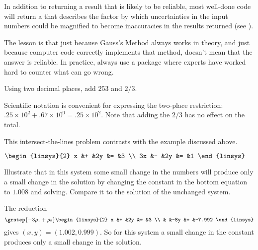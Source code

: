 In addition to returning a result that is likely to be reliable,
most well-done code will return a 
%
that describes the factor by which uncertainties in the input numbers
could be magnified to become inaccuracies in the results returned 
(see \cite{Rice}).

The lesson is that
just because Gauss's Method always works in theory, and just
because computer code correctly implements that method,
doesn't mean that the answer is reliable.
In practice, always use a package
where experts have worked hard to counter what can go wrong.

\begin{exercises}
  \item 
    Using two decimal places, add $253$ and $2/3$.
    \begin{answer}
      Scientific notation is convenient for expressing 
      the two-place restriction:
      $.25\times 10^{2}+.67\times 10^{0}=.25\times 10^{2}$.
      Note that adding the $2/3$ has no effect on the total.
    \end{answer}
  \item 
    This intersect-the-lines problem contrasts with the example
    discussed above.
    \begin{center}
      \vcenteredhbox{\texttt{[image: ch1.34]}}
      \qquad
      $\displaystyle \begin{linsys}{2}
            x &+ &2y &= &3  \\
            3x &- &2y &= &1
      \end{linsys}$
    \end{center}
    Illustrate that in this system 
    some small change in the numbers will produce only a
    small change in the solution by changing the constant in the
    bottom equation to $1.008$ and solving.
    Compare it to the solution of the unchanged system.
    \begin{answer}
      The reduction
      \begin{equation*}
        \grstep{-3\rho_1+\rho_2}
        \begin{linsys}{2}
          x  &+  &2y   &=  &3  \\
             &   &-8y  &=  &-7.992
        \end{linsys}
      \end{equation*}
      gives \( (x,y)=(1.002,0.999) \).
      So for this system a small change in the constant produces only a small
      change in the solution.

\end{answer}
\end{exercises}

